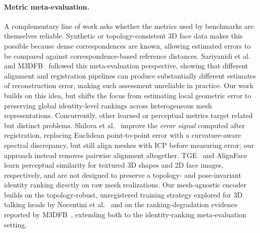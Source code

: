 \documentclass[10pt,twocolumn,letterpaper]{article}
\begin{document}
\paragraph{Metric meta-evaluation.}
A complementary line of work asks whether the metrics used by benchmarks are themselves reliable. Synthetic or topology-consistent 3D face data makes this possible because dense correspondences are known, allowing estimated errors to be compared against correspondence-based reference distances. Sariyanidi et al.~\cite{10448898} and M3DFB~\cite{fg2025} followed this meta-evaluation perspective, showing that different alignment and registration pipelines can produce substantially different estimates of reconstruction error, making such assessment unreliable in practice. Our work builds on this idea, but shifts the focus from estimating local geometric error to preserving global identity-level rankings across heterogeneous mesh representations. Concurrently, other learned or perceptual metrics target related but distinct problems. Shilova et al.~\cite{shilova2026curvature} improve the \emph{error signal} computed after registration, replacing Euclidean point-to-point error with a curvature-aware spectral discrepancy, but still align meshes with ICP before measuring error; our approach instead removes pairwise alignment altogether. TGE~\cite{luan2025tge} and AlignFace~\cite{huang2026alignface} learn perceptual similarity for textured 3D shapes and 2D face images, respectively, and are not designed to preserve a topology- and pose-invariant identity ranking directly on raw mesh realizations. Our mesh-agnostic encoder builds on the topology-robust, unregistered training strategy explored for 3D talking heads by Nocentini et al.~\cite{nocentini2024beyondfixed} and on the ranking-degradation evidence reported by M3DFB~\cite{fg2025}, extending both to the identity-ranking meta-evaluation setting.
\end{document}
